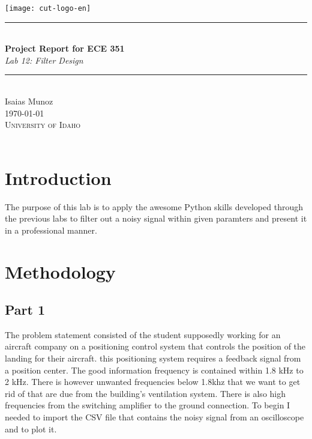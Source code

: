 \documentclass[12pt,a4paper]{article}
\newcommand{\HRule}{\rule{\linewidth}{0.5mm}}
\begin{document}
\begin{titlepage}
\begin{center}
\texttt{[image: cut-logo-en]}~\\[2cm]
\HRule \\[0.4cm]
{ \LARGE 
  \textbf{Project Report for ECE 351}\\[0.4cm]
  \emph{Lab 12: Filter Design}\\[0.4cm]
}
\HRule \\[1.5cm]
{ \large
  Isaias Munoz  \\[0.1cm]
  \today\\[0.1cm]
}
\vfill
\textsc{\Large University of Idaho}\\
\\
 
\end{center}
\end{titlepage}
\newpage
\tableofcontents
{}
\newpage
\setcounter{page}{1}
\section{Introduction}\label{sec:intro}

The purpose of this lab is to apply the awesome Python skills developed through the previous labs to filter out a noisy signal within given paramters and present it in a professional manner.





\section{Methodology}\label{sec:meth}
\subsection{Part 1}
The problem statement consisted of the student supposedly working for an aircraft company on a positioning control system that controls the position of the landing for their aircraft. this positioning system requires a feedback signal from a position center. The good information frequency is contained within 1.8 kHz to 2 kHz. There is however unwanted frequencies below 1.8khz that we want to get rid of that are due from the building's ventilation system. There is also high frequencies from the switching amplifier to the ground connection. To begin I needed to import the CSV file that contains the noisy signal from an oscilloscope and to plot it. 
\end{document}
